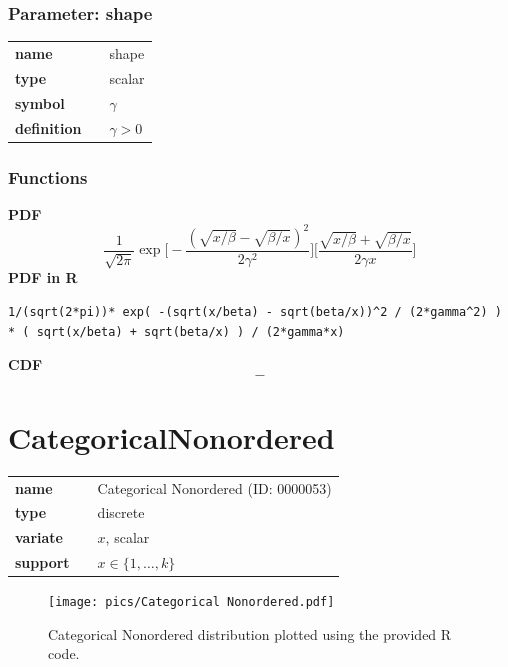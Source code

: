 \documentclass{article}
\begin{document}
\subsubsection*{Parameter: shape}

\noindent\begin{tabular}{p{2cm}cl}
\textbf{name} & & shape \\
\textbf{type} & & scalar \\
\textbf{symbol} & & $\gamma$  \\
\textbf{definition} & & $\gamma > 0$
\end{tabular}
\subsubsection*{Functions}

\smallskip \noindent \hspace{.2cm} \textbf{PDF} 
\begin{equation*}\frac{1}{\sqrt{2\pi}}\exp\Big[-\frac{(\sqrt{x/\beta}-\sqrt{\beta/x})^2}{2\gamma^2}\Big]\Big[\frac{\sqrt{x/\beta}+\sqrt{\beta/x}}{2\gamma x}\Big]\end{equation*}
\smallskip \noindent \hspace{.2cm} \textbf{PDF in R}  
\begin{verbatim}1/(sqrt(2*pi))* exp( -(sqrt(x/beta) - sqrt(beta/x))^2 / (2*gamma^2) ) * ( sqrt(x/beta) + sqrt(beta/x) ) / (2*gamma*x)
\end{verbatim}
\smallskip \noindent \hspace{.2cm} \textbf{CDF} 
\begin{equation*}-\end{equation*}
\smallskip\section*{CategoricalNonordered} 

  \bigskip 

\begin{tabular}{p{2cm}cl}
\textbf{name} & & Categorical Nonordered (ID: 0000053)\\ 
 
\textbf{type} & & discrete \\ 

\textbf{variate} & & $x$, scalar \\ 

\textbf{support} & & $x \in \{1,\dots,k\}$
\end{tabular}

\begin{figure}[ht!]
\centering
  \texttt{[image: pics/Categorical Nonordered.pdf]}
 \caption{Categorical Nonordered distribution plotted using the provided R code.}
 \label{fig:Categorical Nonordered}
\end{figure}
\end{document}
